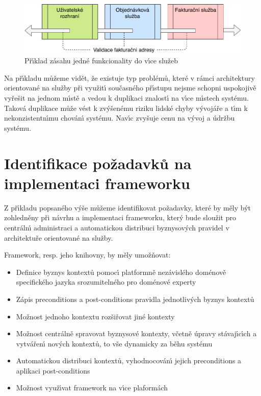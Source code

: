\begin{figure}
    \centering
    \includegraphics[keepaspectratio=true, width=0.8\linewidth]{figures/service-cutting.pdf}
    \caption{Př\'{\i}klad zásahu jedné funkcionality do v\'{\i}ce služeb}
    \label{fig:service-cutting}
\end{figure}

Na př\'{\i}kladu můžeme vidět, že existuje typ problémů, které v rámci architektury
orientované na služby při využit\'{\i} současného př\'{\i}stupu nejsme schopni uspokojivě
vyřešit na jednom m\'{\i}stě a vedou k duplikaci znalost\'{\i} na v\'{\i}ce m\'{\i}stech systému.
Taková duplikace může vést k zv\'yšenému riziku lidské chyby v\'yvojáře a t\'{\i}m k
nekonzistentn\'{\i}mu chován\'{\i} systému. Nav\'{\i}c zvyšuje cenu na v\'yvoj a údržbu systému.

\section{Identifikace požadavků na implementaci frameworku}\label{sec:implementation-requirements}

Z př\'{\i}kladu popsaného v\'yše můžeme identifikovat požadavky, které by měly
b\'yt zohledněny při návrhu a implementaci frameworku, kter\'y bude sloužit
pro centráln\'{\i} administraci a automatickou distribuci byznysov\'ych pravidel
v architektuře orientované na služby.

Framework, resp. jeho knihovny, by měly umožňovat:

\begin{itemize}
    \item{Definice byznys kontextů pomoc\'{\i} platformně nezávislého doménově specifického jazyka srozumitelného pro doménové experty}
    \item{Zápis preconditions a post-conditions pravidla jednotliv\'ych byznys kontextů}
    \item{Možnost jednoho kontextu rozšiřovat jiné kontexty}
    \item{Možnost centrálně spravovat byznysové kontexty, včetně úpravy stávaj\'{\i}c\'{\i}ch a vytvářen\'{\i} nov\'ych kontextů, to vše dynamicky za běhu systému}
    \item{Automatickou distribuci kontextů, vyhodnocován\'{\i} jejich preconditions a aplikaci post-conditions}
    \item{Možnost využ\'{\i}vat framework na v\'{\i}ce plaformách}
\end{itemize}

